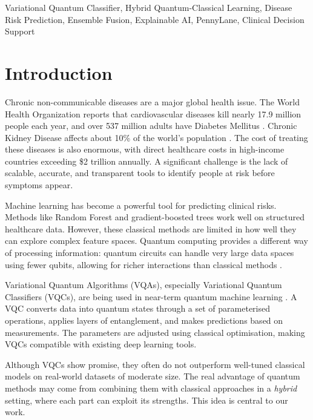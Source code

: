﻿\documentclass[conference]{IEEEtran}
\begin{document}
\begin{IEEEkeywords}
Variational Quantum Classifier, Hybrid Quantum-Classical Learning, Disease Risk
Prediction, Ensemble Fusion, Explainable AI, PennyLane, Clinical Decision Support
\end{IEEEkeywords}

\section{Introduction}

Chronic non-communicable diseases are a major global health issue. The World Health
Organization reports that cardiovascular diseases kill nearly 17.9 million people each
year, and over 537 million adults have Diabetes Mellitus \cite{who2023cvd,idf2021diabetes}.
Chronic Kidney Disease affects about 10\% of the world's population \cite{ckd2020global}.
The cost of treating these diseases is also enormous, with direct healthcare costs in
high-income countries exceeding \$2 trillion annually. A significant challenge is the
lack of scalable, accurate, and transparent tools to identify people at risk before
symptoms appear.

Machine learning has become a powerful tool for predicting clinical risks. Methods like
Random Forest \cite{breiman2001rf} and gradient-boosted trees \cite{chen2016xgboost}
work well on structured healthcare data. However, these classical methods are limited in
how well they can explore complex feature spaces. Quantum computing provides a different
way of processing information: quantum circuits can handle very large data spaces using
fewer qubits, allowing for richer interactions than classical methods
\cite{biamonte2017qml}.

Variational Quantum Algorithms (VQAs), especially Variational Quantum Classifiers
(VQCs), are being used in near-term quantum machine learning \cite{cerezo2021vqa,
schuld2020circuit}. A VQC converts data into quantum states through a set of
parameterised operations, applies layers of entanglement, and makes predictions based on
measurements. The parameters are adjusted using classical optimisation, making VQCs
compatible with existing deep learning tools.

Although VQCs show promise, they often do not outperform well-tuned classical models on
real-world datasets of moderate size. The real advantage of quantum methods may come from
combining them with classical approaches in a \textit{hybrid} setting, where each part
can exploit its strengths. This idea is central to our work.
\end{document}

